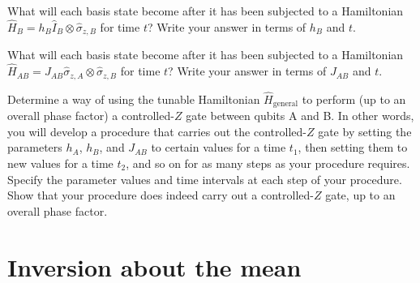 \documentclass{../phys084}
\begin{document}
\begin{exercise}
\begin{problems}
  \item What will each basis state become after it has been subjected
    to a Hamiltonian
    \(\hat H_B = h_B \hat I_B \otimes \hat \sigma_{z,B}\) for time
    \(t\)?  Write your answer in terms of \(h_B\) and \(t\).

  \item What will each basis state become after it has been subjected
    to a Hamiltonian
    \(\hat H_{AB} = J_{AB}\hat \sigma_{z,A} \otimes \hat
    \sigma_{z,B}\) for time \(t\)?  Write your answer in terms of
    \(J_{AB}\) and \(t\).

  \item Determine a way of using the tunable Hamiltonian
    \(\hat H_\text{general}\) to perform (up to an overall phase
    factor) a controlled-\(Z\) gate between qubits A and B.  In other
    words, you will develop a procedure that carries out the
    controlled-\(Z\) gate by setting the parameters \(h_A\), \(h_B\),
    and \(J_{AB}\) to certain values for a time \(t_1\), then setting
    them to new values for a time \(t_2\), and so on for as many steps
    as your procedure requires.  Specify the parameter values and time
    intervals at each step of your procedure.  Show that your
    procedure does indeed carry out a controlled-\(Z\) gate, up to an
    overall phase factor.
  \end{problems}
\end{exercise}

\begin{solution}
  \begin{problems}
  \item
  \item
  \item
  \item
  \end{problems}
\end{solution}

\section{Inversion about the mean}
\end{document}
